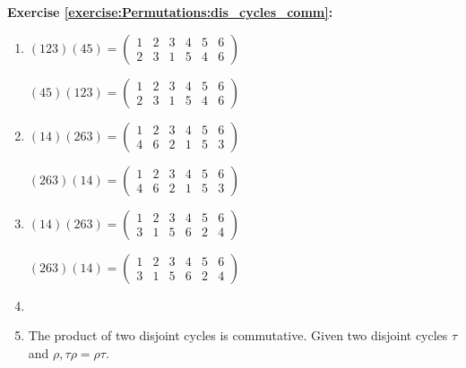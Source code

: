 \noindent\textbf{Exercise \ref{exercise:Permutations:dis_cycles_comm}:}  %
\begin{multicols}{2}
\begin{enumerate}[{a.}]
\item
$(123)(45) = \begin{pmatrix}
1 & 2 & 3 & 4 & 5 & 6\\
2 & 3 & 1 & 5 & 4 & 6
\end{pmatrix}$

$(45)(123) = \begin{pmatrix}
1 & 2 & 3 & 4 & 5 & 6\\
2 & 3 & 1 & 5 & 4 & 6
\end{pmatrix}$

\item
$(14)(263) = \begin{pmatrix}
1 & 2 & 3 & 4 & 5 & 6\\
4 & 6 & 2 & 1 & 5 & 3
\end{pmatrix}$

$(263)(14) = \begin{pmatrix}
1 & 2 & 3 & 4 & 5 & 6\\
4 & 6 & 2 & 1 & 5 & 3
\end{pmatrix}$

\item
$(14)(263) = \begin{pmatrix}
1 & 2 & 3 & 4 & 5 & 6\\
3 & 1 & 5 & 6 & 2 & 4
\end{pmatrix}$

$(263)(14) = \begin{pmatrix}
1 & 2 & 3 & 4 & 5 & 6\\
3 & 1 & 5 & 6 & 2 & 4
\end{pmatrix}$

\item

\item
The product of two disjoint cycles is commutative. Given two disjoint cycles $\tau$ and $\rho, \tau\rho = \rho\tau$.
\end{enumerate}
\end{multicols}

